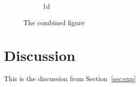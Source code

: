 \documentclass{article}
\begin{document}
\begin{figure}
\begin{subfigure}{0.5\textwidth}
    \caption{1d}
    \label{fig:comb_1d}
  \end{subfigure}
  \caption{The combined figure}
  \label{fig:comb_fig}
\end{figure}

\section{Discussion}
\label{sec:result}
This is the discussion from Section~\ref{sec:exp}


% 

\end{document}

